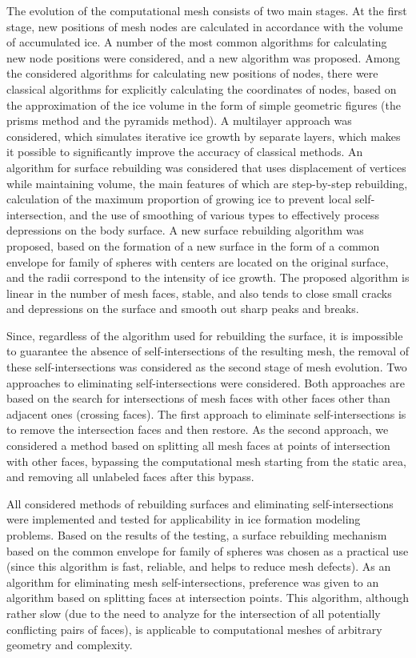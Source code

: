 \documentclass[
11pt,
tightenlines,
twoside,
onecolumn,
nofloats,
nobibnotes,
nofootinbib,
superscriptaddress,
noshowpacs,
centertags]
{revtex4}
\begin{document}
The evolution of the computational mesh consists of two main stages.
At the first stage, new positions of mesh nodes are calculated in accordance with the volume of accumulated ice.
A number of the most common algorithms for calculating new node positions were considered, and a new algorithm was proposed.
Among the considered algorithms for calculating new positions of nodes, there were classical algorithms for explicitly calculating the coordinates of nodes, based on the approximation of the ice volume in the form of simple geometric figures (the prisms method and the pyramids method).
A multilayer approach was considered, which simulates iterative ice growth by separate layers, which makes it possible to significantly improve the accuracy of classical methods.
An algorithm for surface rebuilding was considered that uses displacement of vertices while maintaining volume, the main features of which are step-by-step rebuilding, calculation of the maximum proportion of growing ice to prevent local self-intersection, and the use of smoothing of various types to effectively process depressions on the body surface.
A new surface rebuilding algorithm was proposed, based on the formation of a new surface in the form of a common envelope for family of spheres with centers are located on the original surface, and the radii correspond to the intensity of ice growth.
The proposed algorithm is linear in the number of mesh faces, stable, and also tends to close small cracks and depressions on the surface and smooth out sharp peaks and breaks.

Since, regardless of the algorithm used for rebuilding the surface, it is impossible to guarantee the absence of self-intersections of the resulting mesh, the removal of these self-intersections was considered as the second stage of mesh evolution.
Two approaches to eliminating self-intersections were considered.
Both approaches are based on the search for intersections of mesh faces with other faces other than adjacent ones (crossing faces).
The first approach to eliminate self-intersections is to remove the intersection faces and then restore.
As the second approach, we considered a method based on splitting all mesh faces at points of intersection with other faces, bypassing the computational mesh starting from the static area, and removing all unlabeled faces after this bypass.

All considered methods of rebuilding surfaces and eliminating self-intersections were implemented and tested for applicability in ice formation modeling problems.
Based on the results of the testing, a surface rebuilding mechanism based on the common envelope for family of spheres was chosen as a practical use (since this algorithm is fast, reliable, and helps to reduce mesh defects).
As an algorithm for eliminating mesh self-intersections, preference was given to an algorithm based on splitting faces at intersection points.
This algorithm, although rather slow (due to the need to analyze for the intersection of all potentially conflicting pairs of faces), is applicable to computational meshes of arbitrary geometry and complexity.
\end{document}
